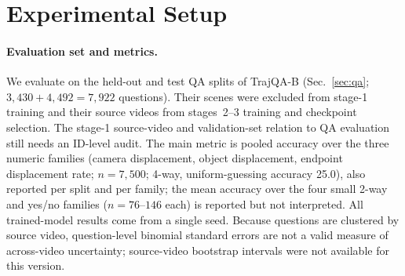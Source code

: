 \section{Experimental Setup}
\label{app:exp_setup}

\paragraph{Evaluation set and metrics.}
We evaluate on the held-out and test QA splits of TrajQA-B (Sec.~\ref{sec:qa}; $3{,}430+4{,}492=7{,}922$ questions). Their scenes were excluded from stage-1 training and their source videos from stages~2--3 training and checkpoint selection. The stage-1 source-video and validation-set relation to QA evaluation still needs an ID-level audit.
The main metric is pooled accuracy over the three numeric families (camera displacement, object displacement, endpoint displacement rate; $n=7{,}500$; 4-way, uniform-guessing accuracy 25.0), also reported per split and per family; the mean accuracy over the four small 2-way and yes/no families ($n=76$--$146$ each) is reported but not interpreted.
All trained-model results come from a single seed. Because questions are clustered by source video, question-level binomial standard errors are not a valid measure of across-video uncertainty; source-video bootstrap intervals were not available for this version.

